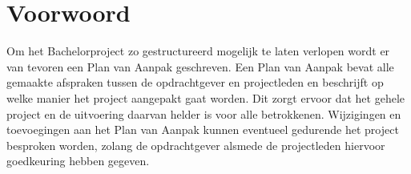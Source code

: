 \section*{Voorwoord}
Om het Bachelorproject zo gestructureerd mogelijk te laten verlopen wordt er van tevoren een Plan van Aanpak geschreven. Een Plan van Aanpak bevat alle gemaakte afspraken tussen de opdrachtgever en projectleden en beschrijft op welke manier het project aangepakt gaat worden. Dit zorgt ervoor dat het gehele project en de uitvoering daarvan helder is voor alle betrokkenen. Wijzigingen en toevoegingen aan het Plan van Aanpak kunnen eventueel gedurende het project besproken worden, zolang de opdrachtgever alsmede de projectleden hiervoor goedkeuring hebben gegeven.